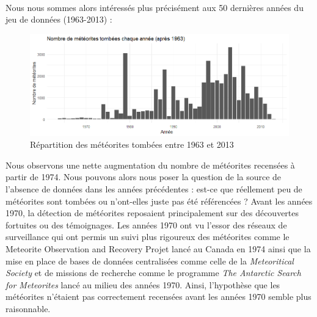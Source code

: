 \documentclass[12pt]{article}
\begin{document}
\\
Nous nous sommes alors intéressés plus précisément aux 50 dernières années du jeu de données (1963-2013) :\\
\begin{figure}[H]
\centering
\includegraphics[width=16cm]{Images/exploration/histogramme1963-2013.png}
\caption{Répartition des météorites tombées entre 1963 et 2013}
\end{figure}
Nous observons une nette augmentation du nombre de météorites recensées à partir de 1974. Nous pouvons alors nous poser la question de la source de l'absence de données dans les années précédentes : est-ce que réellement peu de météorites sont tombées ou n'ont-elles juste pas été référencées ? Avant les années 1970, la détection de météorites reposaient principalement sur des découvertes fortuites ou des témoignages. Les années 1970 ont vu l'essor des réseaux de surveillance qui ont permis un suivi plus rigoureux des météorites comme le Meteorite Observation and Recovery Projet \cite{Article_Canada_1970} lancé au Canada en 1974 ainsi que la mise en place de bases de données centralisées comme celle de la \textit{Meteoritical Society} \cite{BDD_centralisees} et de missions de recherche comme le programme \textit{The Antarctic Search for Meteorites} \cite{Mission_recherche_antartictique} lancé au milieu des années 1970. Ainsi, l'hypothèse que les météorites n'étaient pas correctement recensées avant les années 1970 semble plus raisonnable.
\end{document}

